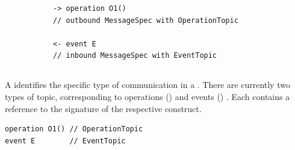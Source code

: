 \begin{figure}[h]

\begin{subfigure}[t]{0.38\textwidth}
\begin{lstlisting}[style=Example]
-> operation O1()
// outbound MessageSpec with OperationTopic

<- event E
// inbound MessageSpec with EventTopic
\end{lstlisting}
\end{subfigure}
\hfill
\begin{subfigure}[t]{0.58\textwidth}
\gsecaption
\centering
{}
\end{subfigure}

\end{figure}

\subsection{\mmessagetopic}\label{ssec:metamodel-messages-topics}

A \mmessagetopic{} identifies the specific type of communication in a
\mmessagespec{}.  There are currently two types of topic, corresponding to
\robochart{} operations (\moperationtopic) and events (\meventtopic)
.
Each contains a reference to the signature of the respective construct.

\begin{lstlisting}[style=Example]
operation O1() // OperationTopic
event E        // EventTopic
\end{lstlisting}

\subsection{\margument}\label{ssec:metamodel-messages-arguments}

